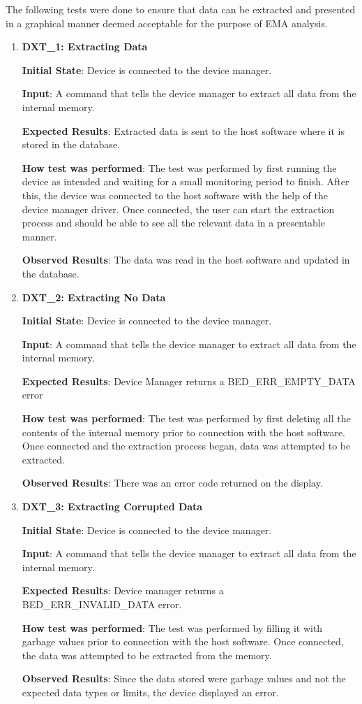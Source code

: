 \documentclass[12pt, titlepage]{article}
\begin{document}
The following tests were done to ensure that data can be extracted and presented in a graphical manner deemed acceptable for the purpose of EMA analysis.
\begin{enumerate}
  \item{\textbf{DXT\_1: Extracting Data} \\}\label{DXT1}

  \textbf{Initial State}: Device is connected to the device manager.

  \textbf{Input}: A command that tells the device manager to extract all data from the internal memory.

  \textbf{Expected Results}: Extracted data is sent to the host software where it is stored in the database.

  \textbf{How test was performed}: The test was performed by first running the device as intended and waiting for a small monitoring period to finish. After this, the device was connected to the host software with the help of the device manager driver. Once connected, the user can start the extraction process and should be able to see all the relevant data in a presentable manner.

  \textbf{Observed Results}: The data was read in the host software and updated in the database.

  \item{\textbf{DXT\_2: Extracting No Data} \\}\label{DXT2}

  \textbf{Initial State}: Device is connected to the device manager.

  \textbf{Input}: A command that tells the device manager to extract all data from the internal memory.

  \textbf{Expected Results}: Device Manager returns a BED\_ERR\_EMPTY\_DATA error

  \textbf{How test was performed}: The test was performed by first deleting all the contents of the internal memory prior to connection with the host software. Once connected and the extraction process began, data was attempted to be extracted.

  \textbf{Observed Results}: There was an error code returned on the display.

  \item{\textbf{DXT\_3: Extracting Corrupted Data} \\}\label{DXT3}

  \textbf{Initial State}: Device is connected to the device manager.

  \textbf{Input}: A command that tells the device manager to extract all data from the internal memory.

  \textbf{Expected Results}: Device manager returns a BED\_ERR\_INVALID\_DATA error.

  \textbf{How test was performed}: The test was performed by filling it with garbage values prior to connection with the host software. Once connected, the data was attempted to be extracted from the memory.

  \textbf{Observed Results}: Since the data stored were garbage values and not the expected data types or limits, the device displayed an error.
\end{enumerate}
\end{document}
